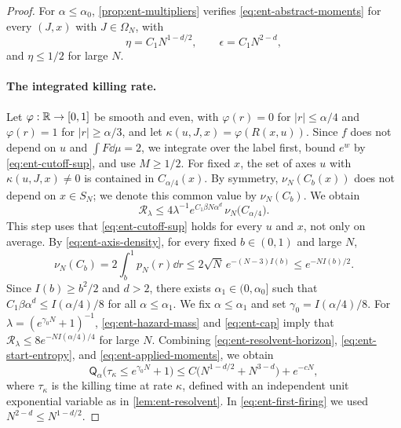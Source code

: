 \begin{proof}
For $\alpha\le\alpha_0$, \cref{prop:ent-multipliers} verifies
\eqref{eq:ent-abstract-moments} for every $(J,x)$ with $J\in\Omega_N$, with
\begin{equation}\label{eq:ent-applied-moments}
 \eta=C_1N^{1-d/2},\qquad\epsilon=C_1N^{2-d},
\end{equation}
and $\eta\le1/2$ for large $N$.

\paragraph{The integrated killing rate.}
Let $\varphi:\mathbb R\to[0,1]$ be smooth and even, with $\varphi(r)=0$ for
$|r|\le\alpha/4$ and $\varphi(r)=1$ for $|r|\ge\alpha/3$, and let
$\kappa(u,J,x)=\varphi(R(x,u))$. Since $f$ does not depend on $u$ and
$\int F\dd\mu=2$, we integrate over the label first, bound $e^w$ by
\eqref{eq:ent-cutoff-sup}, and use $M\ge1/2$. For fixed $x$, the set of
axes $u$ with $\kappa(u,J,x)\neq0$ is contained in $C_{\alpha/4}(x)$. By
symmetry, $\nu_N(C_b(x))$ does not depend on $x\in S_N$; we denote this
common value by $\nu_N(C_b)$. We obtain
\begin{equation}\label{eq:ent-hazard-mass}
 \mathcal R_\lambda\le4\lambda^{-1}e^{C_1\beta N\alpha^d}\,
 \nu_N\bigl(C_{\alpha/4}\bigr).
\end{equation}
This step uses that \eqref{eq:ent-cutoff-sup} holds for every $u$ and $x$,
not only on average. By \eqref{eq:ent-axis-density}, for every fixed
$b\in(0,1)$ and large $N$,
\begin{equation}\label{eq:ent-cap}
 \nu_N(C_b)=2\int_b^1p_N(r)\dd r\le2\sqrt N\,e^{-(N-3)I(b)}
 \le e^{-NI(b)/2}.
\end{equation}
Since $I(b)\ge b^2/2$ and $d>2$, there exists $\alpha_1\in(0,\alpha_0]$
such that $C_1\beta\alpha^d\le I(\alpha/4)/8$ for all $\alpha\le\alpha_1$.
We fix $\alpha\le\alpha_1$ and set $\gamma_0=I(\alpha/4)/8$. For
$\lambda=(e^{\gamma_0N}+1)^{-1}$, \eqref{eq:ent-hazard-mass} and
\eqref{eq:ent-cap} imply that $\mathcal R_\lambda\le8e^{-NI(\alpha/4)/4}$
for large $N$. Combining \eqref{eq:ent-resolvent-horizon}, \eqref{eq:ent-start-entropy},
and \eqref{eq:ent-applied-moments}, we obtain
\begin{equation}\label{eq:ent-first-firing}
 \mathsf Q_\alpha\bigl(\tau_\kappa\le e^{\gamma_0N}+1\bigr)
 \le C\bigl(N^{1-d/2}+N^{3-d}\bigr)+e^{-cN},
\end{equation}
where $\tau_\kappa$ is the killing time at rate $\kappa$, defined with an
independent unit exponential variable as in \cref{lem:ent-resolvent}. In
\eqref{eq:ent-first-firing} we used $N^{2-d}\le N^{1-d/2}$.


\end{proof}

